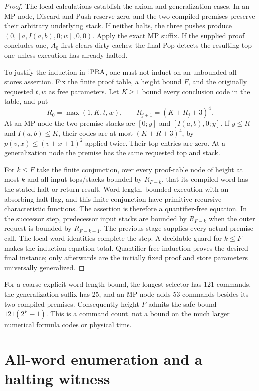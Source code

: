 \begin{proof}
The local calculations establish the axiom and generalization cases.
In an MP node, Discard and Push reserve zero, and the two compiled
premises preserve their arbitrary underlying stack. If neither
halts, the three pushes produce
$(0,[a,I(a,b),0;w],0,0)$. Apply the exact MP suffix. If the supplied
proof concludes one, $A_0$ first clears dirty caches; the final Pop
detects the resulting top one unless execution has already halted.

To justify the induction in $\mathrm{iPRA}$, one must not induct on an
unbounded all-stores assertion. Fix the finite proof table,
a height bound $F$, and the originally requested $t,w$ as free
parameters. Let $K\ge1$ bound every conclusion code in the table, and
put
\[
 R_0=\max(1,K,t,w),\qquad R_{j+1}=(K+R_j+3)^4.
\]
At an MP node the two premise stacks are $[0;y]$ and
$[I(a,b),0;y]$. If $y\le R$ and $I(a,b)\le K$, their codes are
at most $(K+R+3)^4$, by
$p(v,x)\le(v+x+1)^2$ applied twice. Their top entries are zero.
At a generalization node the premise has the same requested top and
stack.

For $k\le F$ take the finite conjunction, over every proof-table
node of height at most $k$ and all input tops/stacks bounded by
$R_{F-k}$, that its compiled word has the stated halt-or-return
result. Word length, bounded execution with an absorbing halt flag,
and this finite conjunction have primitive-recursive characteristic
functions. The assertion is therefore a quantifier-free equation.
In the successor step, predecessor input stacks are bounded by
$R_{F-k}$ when the outer request is bounded by $R_{F-k-1}$.
The previous stage supplies every actual premise call. The local
word identities complete the step. A decidable guard for $k\le F$
makes the induction equation total. Quantifier-free induction
proves the desired final instance; only afterwards are the initially
fixed proof and store parameters universally generalized.
\end{proof}

For a coarse explicit word-length bound, the longest selector has
121 commands, the generalization suffix has 25, and an MP node adds
53 commands besides its two compiled premises. Consequently height
$F$ admits the safe bound $121(2^F-1)$. This is a command count, not a
bound on the much larger numerical formula codes or physical time.

\section{All-word enumeration and a halting witness}
\label{sec:scheduler}

